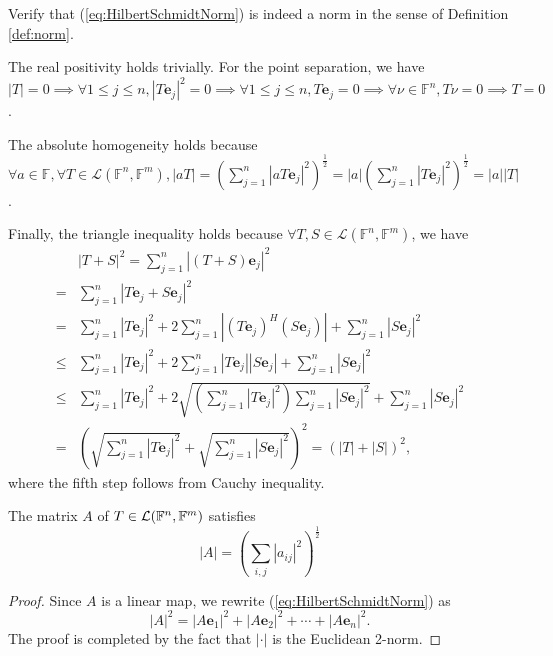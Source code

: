 \begin{exc}
  Verify that (\ref{eq:HilbertSchmidtNorm})
  is indeed a norm in the sense of Definition \ref{def:norm}.
\end{exc}
\begin{solution}
  The real positivity holds trivially.
  For the point separation, we have
  $|T| = 0 \implies \forall 1 \leq j \leq n,|T\mathbf{e}_j|^2 = 0
  \implies \forall 1 \leq j \leq n, T\mathbf{e}_j = 0 \implies \forall
  \nu \in \mathbb{F}^n, T\nu = 0 \implies T = 0$.

  The absolute homogeneity holds because
  $\forall a \in \mathbb{F}, \forall T \in \mathcal{L}(\mathbb{F}^n,
  \mathbb{F}^m), |aT| = (\sum\limits_{j =
    1}^n|aT\mathbf{e}_j|^2)^{\frac{1}{2}} = |a|(\sum\limits_{j =
    1}^n|T\mathbf{e}_j|^2)^{\frac{1}{2}} = |a||T|$.

  Finally, the triangle inequality holds because
  $\forall T, S \in \mathcal{L}(\mathbb{F}^n, \mathbb{F}^m)$, we have
    \begin{align*}
      &|T + S|^2 = \sum\limits_{j = 1}^n|(T+S)\mathbf{e}_j|^2
      \\ =& \sum\limits_{j = 1}^n|T\mathbf{e}_j + S\mathbf{e}_j|^2
      \\
      =& \sum\limits_{j = 1}^n|T\mathbf{e}_j|^2
         + 2\sum\limits_{j = 1}^n|(T\mathbf{e}_j)^H(S\mathbf{e}_j)|
         + \sum\limits_{j = 1}^n|S\mathbf{e}_j|^2
      \\
      \le& \sum\limits_{j = 1}^n|T\mathbf{e}_j|^2
           + 2\sum\limits_{j = 1}^n|T\mathbf{e}_j||S\mathbf{e}_j|
           + \sum\limits_{j = 1}^n|S\mathbf{e}_j|^2
      \\
      \le& \sum\limits_{j = 1}^n|T\mathbf{e}_j|^2 %
           + 2\sqrt{\left(\sum\limits_{j = 1}^n|T\mathbf{e}_j|^2\right)
           \sum\limits_{j = 1}^n|S\mathbf{e}_j|^2}
           + \sum\limits_{j = 1}^n|S\mathbf{e}_j|^2
      \\
      =& \left(\sqrt{\sum\limits_{j = 1}^n|T\mathbf{e}_j|^2} +
         \sqrt{\sum\limits_{j = 1}^n|S\mathbf{e}_j|^2}\right)^2 = (|T|
         + |S|)^2, 
    \end{align*}
  where the fifth step follows from Cauchy inequality.  
\end{solution}

\begin{coro}
  \label{coro:HilbertSchmidtNormMatrix}
  The matrix $A$ %
  of \mbox{$T\in {\cal L}(\mathbb{F}^n,\mathbb{F}^m)$}
  satisfies
  \begin{equation}
    \label{eq:HilbertSchmidtNormMatrix}
    |A| = \left(
      \sum_{i,j} |a_{ij}|^2
    \right)^{\frac{1}{2}}
  \end{equation}
\end{coro}
\begin{proof}
  Since $A$ is a linear map, we rewrite (\ref{eq:HilbertSchmidtNorm}) as
  \begin{displaymath}
    |A|^2 =  |A \mathbf{e}_1|^2 + |A \mathbf{e}_2|^2 + \cdots
    + |A \mathbf{e}_n|^2.
  \end{displaymath}
  The proof is completed by the fact that
  $|\cdot|$ is the Euclidean 2-norm.
\end{proof}

